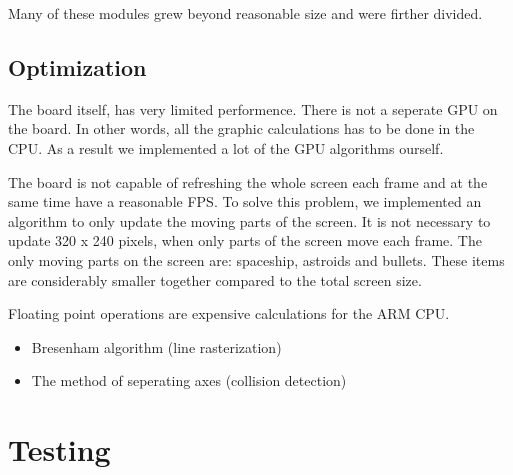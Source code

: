 Many of these modules grew beyond reasonable size and were firther divided. 

\subsection{Optimization}
The board itself, has very limited performence. There is not a seperate GPU on the board. In other words, all the graphic calculations has to be done in the CPU. As a result we implemented a lot of the GPU algorithms ourself.

The board is not capable of refreshing the whole screen each frame and at the same time have a reasonable FPS. To solve this problem, we implemented an algorithm to only update the moving parts of the screen. It is not necessary to update 320 x 240 pixels, when only parts of the screen move each frame. The only moving parts on the screen are: spaceship, astroids and bullets. These items are considerably smaller together compared to the total screen size.

Floating point operations are expensive calculations for the ARM CPU. 

\begin{itemize}
\item Bresenham algorithm (line rasterization) \cite{graphics-algorithms}
\item The method of seperating axes (collision detection) \cite{collision-algorithms}
\end{itemize}


\section{Testing}
